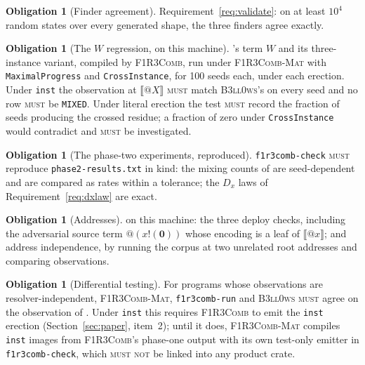 \documentclass[11pt,a4paper]{article}
\makeatletter
\newcommand{\code}[1]{\texttt{#1}}
\newcommand{\Comb}{\textsc{F1R3Comb}}
\newcommand{\Mat}{\textsc{F1R3Comb-Mat}}
\newcommand{\Bell}{\textsc{B3ll0ws}}
\newcommand{\MUST}{\textsc{must}}
\newcommand{\MUSTNOT}{\textsc{must not}}
\newcommand{\quo}[1]{@#1}
\newcommand{\nil}{\mathbf{0}}
\theoremstyle{definition}
\newtheorem{obligation}[definition]{Obligation}
\theoremstyle{plain}
\newcommand{\enc}[1]{\llbracket #1 \rrbracket}
\newcommand{\out}[2]{#1!(#2)}
\makeatother
\begin{document}
\begin{obligation}[Finder agreement]\label{obl:finders}
Requirement~\ref{req:validate}: on at least $10^{4}$ random states over every
generated shape, the three finders agree exactly.
\end{obligation}

\begin{obligation}[The $W$ regression, on this machine]\label{obl:W}
\cite[Obl.~11.1]{combspec}'s term $W$ and its three-instance variant, compiled
by \Comb, run under \Mat{} with \code{MaximalProgress} and
\code{CrossInstance}, for 100 seeds each, under each erection. Under
\code{inst} the observation at $\enc{\quo{X}}$ \MUST{} match \Bell's on every
seed and no row \MUST{} be \code{MIXED}. Under literal erection the test
\MUST{} record the fraction of seeds producing the crossed residue; a
fraction of zero under \code{CrossInstance} would contradict
\cite[Find.~14.1]{matnote} and \MUST{} be investigated.
\end{obligation}

\begin{obligation}[The phase-two experiments, reproduced]\label{obl:phase2}
\code{f1r3comb-check} \MUST{} reproduce \code{phase2-results.txt} in kind:
the mixing counts of \cite[Find.~14.1]{matnote} are seed-dependent and are
compared as rates within a tolerance; the $D_{x}$ laws of
Requirement~\ref{req:dxlaw} are exact.
\end{obligation}

\begin{obligation}[Addresses]\label{obl:addr}
\cite[Obl.~11.5, Obl.~11.10]{combspec} on this machine: the three deploy
checks, including the adversarial source term $\quo{(\out{x}{\nil})}$ whose
encoding is a leaf of $\enc{\quo{x}}$; and address independence, by running
the corpus at two unrelated root addresses and comparing observations.
\end{obligation}

\begin{obligation}[Differential testing]\label{obl:diff}
For programs whose observations are resolver-independent, \Mat, \code{f1r3comb-run}
and \Bell{} \MUST{} agree on the observation of \cite[Obl.~11.7]{combspec}.
Under \code{inst} this requires \Comb{} to emit the \code{inst} erection
(Section~\ref{sec:paper}, item~2); until it does, \Mat{} compiles
\code{inst} images from \Comb's phase-one output with its own test-only
emitter in \code{f1r3comb-check}, which \MUSTNOT{} be linked into any
product crate.
\end{obligation}
\end{document}
